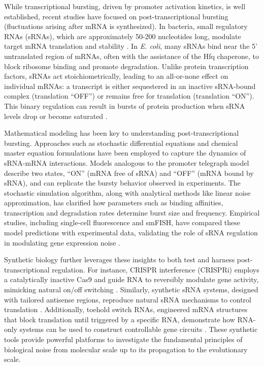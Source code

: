 While transcriptional bursting, driven by promoter activation kinetics, is well established, recent studies have focused on post-transcriptional bursting (fluctuations arising after mRNA is synthesized). In bacteria, small regulatory RNAs (sRNAs), which are approximately 50-200 nucleotides long, modulate target mRNA translation and stability \cite{Gottesman2004,Waters2009}. In \textit{E. coli}, many sRNAs bind near the 5' untranslated region of mRNAs, often with the assistance of the Hfq chaperone, to block ribosome binding and promote degradation. Unlike protein transcription factors, sRNAs act stoichiometrically, leading to an all-or-none effect on individual mRNAs: a transcript is either sequestered in an inactive sRNA-bound complex (translation ``OFF'') or remains free for translation (translation ``ON''). This binary regulation can result in bursts of protein production when sRNA levels drop or become saturated \cite{Levine2007}.

Mathematical modeling has been key to understanding post-transcriptional bursting. Approaches such as stochastic differential equations and chemical master equation formulations have been employed to capture the dynamics of sRNA-mRNA interactions. Models analogous to the promoter telegraph model describe two states, ``ON'' (mRNA free of sRNA) and ``OFF'' (mRNA bound by sRNA), and can replicate the bursty behavior observed in experiments. The stochastic simulation algorithm, along with analytical methods like linear noise approximation, has clarified how parameters such as binding affinities, transcription and degradation rates determine burst size and frequency. Empirical studies, including single-cell fluorescence and smFISH, have compared these model predictions with experimental data, validating the role of sRNA regulation in modulating gene expression noise \cite{Golding2005,Taniguchi2010,Levine2007,Rodrigo2018}.

Synthetic biology further leverages these insights to both test and harness post-transcriptional regulation. For instance, CRISPR interference (CRISPRi) employs a catalytically inactive Cas9 and guide RNA to reversibly modulate gene activity, mimicking natural on/off switching \cite{Qi2013}. Similarly, synthetic sRNA systems, designed with tailored antisense regions, reproduce natural sRNA mechanisms to control translation \cite{Sharma2012}. Additionally, toehold switch RNAs, engineered mRNA structures that block translation until triggered by a specific RNA, demonstrate how RNA-only systems can be used to construct controllable gene circuits \cite{Green2014,Qian2011}. These synthetic tools provide powerful platforms to investigate the fundamental principles of biological noise from molecular scale up to its propagation to the evolutionary scale.

